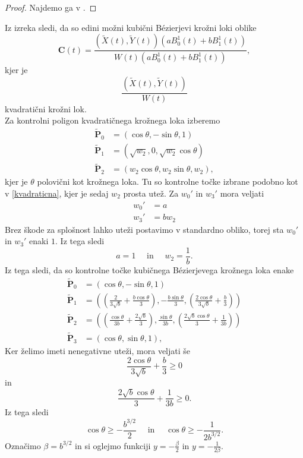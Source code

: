 \documentclass[a4paper,11pt]{article}
\theoremstyle{definition}
\theoremstyle{plain}
\begin{document}
\begin{proof}
Najdemo ga v \cite{chou}.
\end{proof}

\noindent
Iz izreka sledi, da so edini možni kubični B\'ezierjevi krožni loki oblike
$$\boldsymbol{C}(t)=\frac{(\tilde{X}(t),\tilde{Y}(t))(aB_0^1(t)+bB_1^1(t))}{W(t)(aB_0^1(t)+bB_1^1(t))},$$
kjer je $$\frac{(\tilde{X}(t),\tilde{Y}(t))}{W(t)}$$
kvadratični krožni lok.\\
\noindent
Za kontrolni poligon kvadratičnega krožnega loka izberemo
\begin{align*}
\boldsymbol{\tilde{P}}_0 &= (\cos{\theta}, -\sin{\theta}, 1)\\
\boldsymbol{\tilde{P}}_1 &= (\sqrt{w_2}, 0,\sqrt{w_2} \cos{\theta})\\
\boldsymbol{\tilde{P}}_2 &= (w_2\cos \theta, w_2 \sin\theta, w_2),
\end{align*}
kjer je $\theta$ polovični kot krožnega loka. Tu so kontrolne točke izbrane podobno kot v \ref{kvadraticna}, kjer je sedaj $w_2$ prosta utež.
Za $w_0'$ in $w_3'$ mora veljati
\begin{align*}
w_0'&=a \\
w_3'&=bw_2
\end{align*}
Brez škode za splošnost lahko uteži postavimo v standardno obliko, torej sta $w_0'$ in $w_3'$ enaki $1$. Iz tega sledi
$$ a=1 \quad \text{ in } \quad w_2=\frac{1}{b}.$$
Iz tega sledi, da so kontrolne točke kubičnega B\'ezierjevega krožnega loka enake
\begin{align*}
\boldsymbol{\tilde{P}}_0 &= (\cos{\theta}, -\sin{\theta}, 1)\\
\boldsymbol{\tilde{P}}_1 &= \left ( \left (\frac{2}{3\sqrt{b}}+\frac{b\cos \theta}{3}\right ),-\frac{b \sin \theta}{3},\left (\frac{2\cos \theta}{3\sqrt{b}}+\frac{b}{3}\right )\right )\\
\boldsymbol{\tilde{P}}_2 &= \left ( \left (\frac{\cos \theta}{3b}+\frac{2\sqrt{b}}{3}\right ),\frac{\sin \theta}{3b},\left (\frac{2\sqrt{b}\cos \theta}{3}+\frac{1}{3b}\right )\right )\\
\boldsymbol{\tilde{P}}_3 &= (\cos \theta, \sin\theta, 1),
\end{align*}
Ker želimo imeti nenegativne uteži, mora veljati še
$$\frac{2\cos \theta}{3\sqrt{b}}+\frac{b}{3}\geq0$$
in
$$\frac{2\sqrt{b}\cos \theta}{3}+\frac{1}{3b}\geq0.$$
Iz tega sledi
$$\cos \theta \geq -\frac{b^{3/2}}{2}\quad\text{ in }\quad \cos  \theta \geq -\frac{1}{2b^{3/2}}.$$
Označimo $\beta=b^{3/2}$ in si oglejmo funkciji $y=-\frac{\beta}{2}$ in $y=-\frac{1}{2\beta}$.\\
\end{document}
